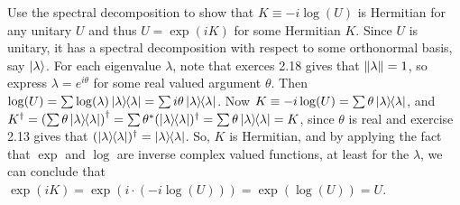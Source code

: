  Use the spectral decomposition to show that $K\equiv-i\log(U)$ is Hermitian for any unitary $U$ and thus $U=\exp(iK)$ for some Hermitian $K$.
\Soln Since $U$ is unitary, it has a spectral decomposition with respect to some orthonormal basis, say $\ket{\lambda}$.  For each eigenvalue $\lambda$, note that exerces 2.18 gives that $\left\lVert\lambda\right\rVert = 1$, so express $\lambda=e^{i\theta}$ for some real valued argument $\theta$.  Then $\log(U) = \sum \log(\lambda)\ket{\lambda}\hspace{-1mm} \bra{\lambda}=\sum i\theta\ket{\lambda}\hspace{-1mm} \bra{\lambda}$.  Now $K \equiv -i\log(U) = \sum \theta \ket{\lambda}\hspace{-1mm} \bra{\lambda}$, and $K^\dagger = \left(\sum \theta\ket{\lambda}\hspace{-1mm} \bra{\lambda}\right)^\dagger = \sum \theta^*(\ket{\lambda}\hspace{-1mm} \bra{\lambda})^\dagger= \sum \theta\ket{\lambda}\hspace{-1mm} \bra{\lambda} = K$, since $\theta$ is real and exercise 2.13 gives that $(\ket{\lambda}\hspace{-1mm} \bra{\lambda})^\dagger=\ket{\lambda}\hspace{-1mm} \bra{\lambda}$.  So, $K$ is Hermitian, and by applying the fact that $\exp$ and $\log$ are inverse complex valued functions, at least for the $\lambda$, we can conclude that $\exp(iK)=\exp(i\cdot(-i\log(U))) = \exp(\log(U)) = U$.

%

